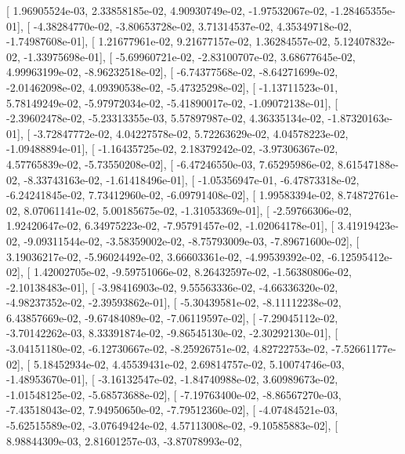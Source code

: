 \documentclass{article}
\begin{document}
       [  1.96905524e-03,   2.33858185e-02,   4.90930749e-02,
         -1.97532067e-02,  -1.28465355e-01],
       [ -4.38284770e-02,  -3.80653728e-02,   3.71314537e-02,
          4.35349718e-02,  -1.74987608e-01],
       [  1.21677961e-02,   9.21677157e-02,   1.36284557e-02,
          5.12407832e-02,  -1.33975698e-01],
       [ -5.69960721e-02,  -2.83100707e-02,   3.68677645e-02,
          4.99963199e-02,  -8.96232518e-02],
       [ -6.74377568e-02,  -8.64271699e-02,  -2.01462098e-02,
          4.09390538e-02,  -5.47325298e-02],
       [ -1.13711523e-01,   5.78149249e-02,  -5.97972034e-02,
         -5.41890017e-02,  -1.09072138e-01],
       [ -2.39602478e-02,  -5.23313355e-03,   5.57897987e-02,
          4.36335134e-02,  -1.87320163e-01],
       [ -3.72847772e-02,   4.04227578e-02,   5.72263629e-02,
          4.04578223e-02,  -1.09488894e-01],
       [ -1.16435725e-02,   2.18379242e-02,  -3.97306367e-02,
          4.57765839e-02,  -5.73550208e-02],
       [ -6.47246550e-03,   7.65295986e-02,   8.61547188e-02,
         -8.33743163e-02,  -1.61418496e-01],
       [ -1.05356947e-01,  -6.47873318e-02,  -6.24241845e-02,
          7.73412960e-02,  -6.09791408e-02],
       [  1.99583394e-02,   8.74872761e-02,   8.07061141e-02,
          5.00185675e-02,  -1.31053369e-01],
       [ -2.59766306e-02,   1.92420647e-02,   6.34975223e-02,
         -7.95791457e-02,  -1.02064178e-01],
       [  3.41919423e-02,  -9.09311544e-02,  -3.58359002e-02,
         -8.75793009e-03,  -7.89671600e-02],
       [  3.19036217e-02,  -5.96024492e-02,   3.66603361e-02,
         -4.99539392e-02,  -6.12595412e-02],
       [  1.42002705e-02,  -9.59751066e-02,   8.26432597e-02,
         -1.56380806e-02,  -2.10138483e-01],
       [ -3.98416903e-02,   9.55563336e-02,  -4.66336320e-02,
         -4.98237352e-02,  -2.39593862e-01],
       [ -5.30439581e-02,  -8.11112238e-02,   6.43857669e-02,
         -9.67484089e-02,  -7.06119597e-02],
       [ -7.29045112e-02,  -3.70142262e-03,   8.33391874e-02,
         -9.86545130e-02,  -2.30292130e-01],
       [ -3.04151180e-02,  -6.12730667e-02,  -8.25926751e-02,
          4.82722753e-02,  -7.52661177e-02],
       [  5.18452934e-02,   4.45539431e-02,   2.69814757e-02,
          5.10074746e-03,  -1.48953670e-01],
       [ -3.16132547e-02,  -1.84740988e-02,   3.60989673e-02,
         -1.01548125e-02,  -5.68573688e-02],
       [ -7.19763400e-02,  -8.86567270e-03,  -7.43518043e-02,
          7.94950650e-02,  -7.79512360e-02],
       [ -4.07484521e-03,  -5.62515589e-02,  -3.07649424e-02,
          4.57113008e-02,  -9.10585883e-02],
       [  8.98844309e-03,   2.81601257e-03,  -3.87078993e-02,
\end{document}
